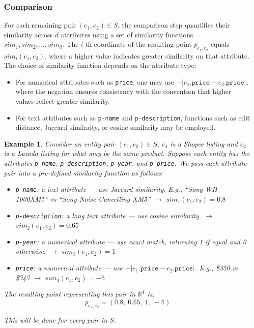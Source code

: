 \documentclass[11pt, a4paper]{article}
\theoremstyle{boxed}
\newtheorem{innerexample}{Example}[section]
\newenvironment{example}
  {\begin{mdframed}[style=thmstyle]\begin{innerexample}}
  {\end{innerexample}\end{mdframed}}
\begin{document}
\subsubsection{Comparison}
For each remaining pair $(e_1, e_2) \in S$, the comparison step quantifies their similarity across $d$ attributes using a set of similarity functions $sim_1, sim_2, \ldots, sim_d$. The $i$-th coordinate of the resulting point $p_{e_1,e_2}$ equals $sim_i(e_1, e_2)$, where a higher value indicates greater similarity on that attribute. The choice of similarity function depends on the attribute type:
\begin{itemize}
  \item For numerical attributes such as \texttt{price}, one may use $-|e_1.\texttt{price} - e_2.\texttt{price}|$, where the negation ensures consistency with the convention that higher values reflect greater similarity. 
  \item For text attributes such as \texttt{p-name} and \texttt{p-description}, functions such as edit distance, Jaccard similarity, or cosine similarity may be employed. 
\end{itemize}
\newpage
\begin{example}
  Consider an entity pair $(e_1, e_2) \in S$. $e_1$ is a Shopee listing and $e_2$ is a Lazada listing for what may be the same product. Suppose each entity has the attributes \texttt{p-name}, \texttt{p-description}, \texttt{p-year}, and \texttt{p-price}. We pass each attribute pair into a pre-defined similarity function as follows:
  \begin{itemize}
    \item \texttt{p-name}: a text attribute --- use Jaccard similarity. E.g., \textit{``Sony WH-1000XM5''} vs \textit{``Sony Noise Cancelling XM5''} $\rightarrow$ $sim_1(e_1, e_2) = 0.8$
    
    \item \texttt{p-description}: a long text attribute --- use cosine similarity. $\rightarrow$ $sim_2(e_1, e_2) = 0.65$
    
    \item \texttt{p-year}: a numerical attribute --- use exact match, returning 1 if equal and 0 otherwise. $\rightarrow$ $sim_3(e_1, e_2) = 1$
    
    \item \texttt{price}: a numerical attribute --- use $-|e_1.\texttt{price} - e_2.\texttt{price}|$. E.g., \$350 vs \$345 $\rightarrow$ $sim_4(e_1, e_2) = -5$
  \end{itemize}

  The resulting point representing this pair in $\mathbb{R}^4$ is: $$p_{e_1, e_2} = (0.8,\ 0.65,\ 1,\ -5)$$

  This will be done for every pair in $S$.
\end{example}
\end{document}
